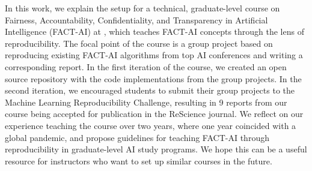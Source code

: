 
In this work, we explain the setup for a technical, graduate-level course on Fairness, Accountability, Confidentiality, and Transparency in Artificial Intelligence (FACT-AI) at \OurUniversity{}, which teaches FACT-AI concepts through the lens of reproducibility. 
The focal point of the course is a group project based on reproducing existing FACT-AI algorithms from top AI conferences and writing a corresponding report. 
In the first iteration of the course, we created an open source repository with the code implementations from the group projects. 
In the second iteration, we encouraged students to submit their group projects to the Machine Learning Reproducibility Challenge, resulting in 9 reports from our course being accepted for publication in the ReScience journal. 
We reflect on our experience teaching the course over two years, where one year coincided with a global pandemic, and propose guidelines for teaching FACT-AI through reproducibility in graduate-level AI study programs. 
We hope this can be a useful resource for instructors who want to set up similar courses in the future. 
